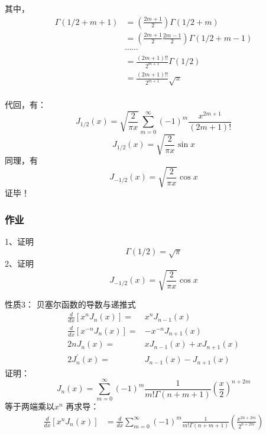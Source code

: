 \begin{frame}
	其中， 
	\begin{equation*}
		\begin{split}
			\Gamma(1/2+m+1) &= (\frac{2m+1}{2}) \Gamma(1/2+m) \\
			& = (\frac{2m+1}{2}\frac{2m-1}{2})  \Gamma(1/2+m-1) \\
			&\cdots \cdots \\
			& = \frac{(2m+1)!!}{2^{m+1}} \Gamma(1/2) \\
			& = \frac{(2m+1)!!}{2^{m+1}} \sqrt{\pi} \\
		\end{split}	
	\end{equation*}	
\end{frame}	

\begin{frame}
	代回，有：
	\begin{equation*}
		J_{1/2}(x) = \sqrt{\frac{2}{\pi x}} \sum\limits_{m=0}^{\infty} (-1)^m  \frac{x^{2m+1}}{(2m+1)!} 
	\end{equation*}	 
	\begin{equation*}
		J_{1/2}(x) = \sqrt{\frac{2}{\pi x}} \sin x  
	\end{equation*}	 
	同理，有  
	\begin{equation*}
		J_{-1/2}(x) = \sqrt{\frac{2}{\pi x}} \cos x  
	\end{equation*}	 
	\alert{证毕！} 
\end{frame}

\begin{frame}
	\frametitle{作业}
	1、证明 \[ \Gamma(1/2)=\sqrt{\pi}\]
	2、证明
	\begin{equation*}
		J_{-1/2}(x) = \sqrt{\frac{2}{\pi x}} \cos x  
	\end{equation*}
\end{frame}

\begin{frame}
	\alert{性质3：} 贝塞尔函数的导数与递推式 \\
	\begin{equation*}
		\begin{split}
			\frac{d}{d x}\left[x^{n} J_{n}(x)\right]= &x^{n} J_{n-1}(x) \\
			\frac{d}{d x}\left[x^{-n} J_{n}(x)\right]=& -x^{-n} J_{n+1}(x) \\
			2 n J_{n}(x)=&xJ_{n-1}(x)+x J_{n+1}(x) \\
			2 J_{n}^{\prime}(x)=&J_{n-1}(x)-J_{n+1}(x)
		\end{split}
	\end{equation*}		
	\alert{证明：}
	\begin{equation*}
		J_n(x) = \sum\limits_{m=0}^{\infty} (-1)^m  \frac{1}{m! \Gamma(n+m+1) } (\frac{x}{2})^{n+2m} 
	\end{equation*}	 
	等于两端乘以$x^n$ 再求导：
	\begin{equation*}
	\begin{split}
		\frac{d}{dx} [x^n J_n(x)]&= \frac{d}{dx}\sum\limits_{m=0}^{\infty} (-1)^m  
		\frac{1}{m! \Gamma(n+m+1) } (\frac{x^{2n+2m}}{2^{n+2m}})\\	
	\end{split}
	\end{equation*}		
\end{frame}	

